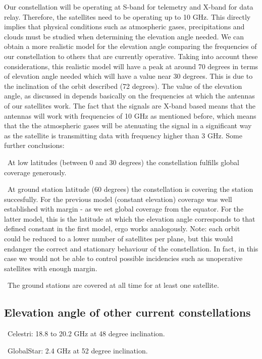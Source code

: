 Our constellation will be operating at S-band for telemetry and X-band for data relay. Therefore, the satellites need to be operating up to 10 GHz. This directly implies that physical conditions such as atmospheric gases, precipitations and clouds must be studied when determining the elevation angle needed. We can obtain a more realistic model for the elevation angle comparing the frequencies of our constellation to others that are currently operative. Taking into account these considerations, this realistic model will have a peak at around 70 degrees in terms of elevation angle needed which will have a value near 30 degrees. This is due to the inclination of the orbit described (72 degrees). The value of the elevation angle, as discussed in \cite{Li2016} depends basically on the frequencies at which the antennas of our satellites work. The fact that the signals are X-band based means that the antennas will work with frequencies of 10 GHz as mentioned before, which means that the the atmospheric gases will be atenuating the signal in a significant way as the satellite is transmitting data with frequency higher than 3 GHz. Some further conclusions:

\textendash\  At low latitudes (between 0 and 30 degrees) the constellation fulfills global coverage generously.

\textendash\ At ground station latitude (60 degrees) the constellation is covering the station succesfully. For the previous model (constant elevation) coverage was well established with margin - as we set global coverage from the equator. For the latter model, this is the latitude at which the elevation angle corresponds to that defined constant in the first model, ergo works analogously. Note: each orbit could be reduced to a lower number of satellites per plane, but this would endanger the correct and stationary behaviour of the constellation. In fact, in this case we would not be able to control possible incidencies such as unoperative satellites with enough margin.

\textendash\ The ground stations are covered at all time for at least one satellite.

\subsection{Elevation angle of other current constellations}
\textendash\ Celestri: 18.8 to 20.2 GHz at 48 degree inclination.

\textendash\ GlobalStar: 2.4 GHz at 52 degree inclination.

